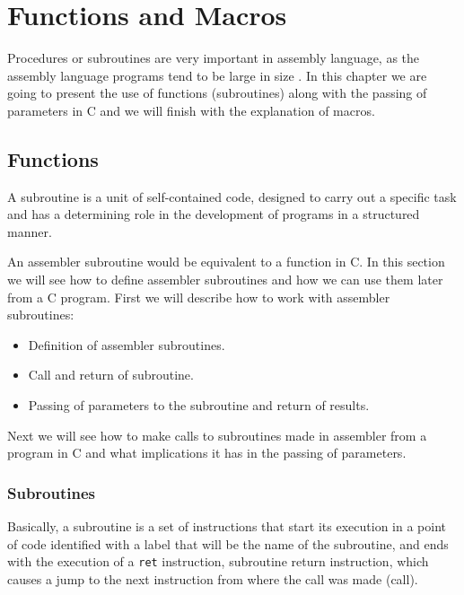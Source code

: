 \chapter{Functions and Macros}
Procedures or subroutines are very important in assembly language, as the assembly language programs tend to be large in size \cite{website:NASM-TutorialsPoint}. In this chapter we are going to present the use of functions (subroutines) along with the passing of parameters in C and we will finish with the explanation of macros.

\section{Functions}
A subroutine is a unit of self-contained code, designed to carry out a specific task and has a determining role in the development of programs in a structured manner.

An assembler subroutine would be equivalent to a function in C. In this section we will see how to define assembler subroutines and how we can use them later from a C program. First we will describe how to work with assembler subroutines:

\begin{itemize}
\item Definition of assembler subroutines.
\item Call and return of subroutine.
\item Passing of parameters to the subroutine and return of results.
\end{itemize}

Next we will see how to make calls to subroutines made in assembler from a program in C and what implications it has in the passing of parameters.

\subsection{Subroutines}
Basically, a subroutine is a set of instructions that start its execution in a point of code identified with a label that will be the name of the subroutine, and ends with the execution of a \texttt{ret} instruction, subroutine return instruction, which causes a jump to the next instruction from where the call was made (call).

